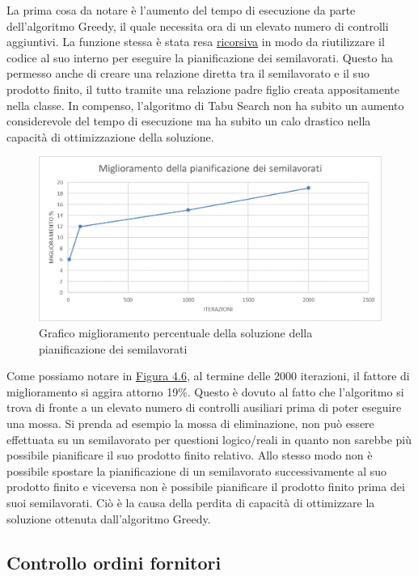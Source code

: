 La prima cosa da notare è l'aumento del tempo di esecuzione da parte dell'algoritmo Greedy, il quale necessita ora di un elevato numero di controlli aggiuntivi. La funzione
stessa è stata resa \hyperref[Ricorsione]{ricorsiva\glo} in modo da riutilizzare il codice al suo interno per eseguire la pianificazione dei semilavorati. Questo ha permesso anche di creare una
relazione diretta tra il semilavorato e il suo prodotto finito, il tutto tramite una relazione padre figlio creata appositamente nella classe.
In compenso, l'algoritmo di Tabu Search non ha subito un aumento considerevole del tempo di esecuzione ma ha subito un calo drastico nella capacità di ottimizzazione della
soluzione.

\begin{figure}[H]
	\includegraphics[width=13cm]{immagini/graficosl3.png}
	\centering
    \caption{Grafico miglioramento percentuale della soluzione della pianificazione dei semilavorati}
    \label{4.6}
\end{figure}

Come possiamo notare in \hyperref[4.6]{Figura 4.6}, al termine delle 2000 iterazioni, il fattore di miglioramento si aggira attorno 19\%. Questo è dovuto al fatto che l'algoritmo
si trova di fronte a un elevato numero di controlli ausiliari prima di poter eseguire una mossa. Si prenda ad esempio la mossa di eliminazione, non può essere effettuata su un semilavorato
per questioni logico/reali in quanto non sarebbe più possibile pianificare il suo prodotto finito relativo. Allo stesso modo non è possibile spostare la pianificazione di un
semilavorato successivamente al suo prodotto finito e viceversa non è possibile pianificare il prodotto finito prima dei suoi semilavorati. Ciò è la causa della perdita di
capacità di ottimizzare la soluzione ottenuta dall'algoritmo Greedy.

\newpage
\subsection{Controllo ordini fornitori}

